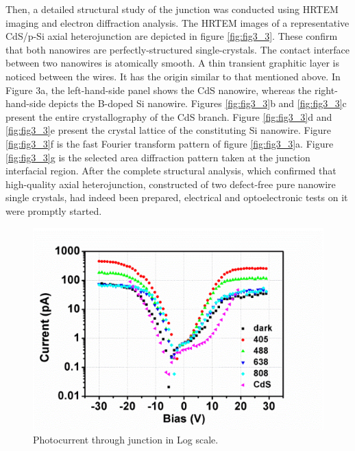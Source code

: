 Then, a detailed structural study of the junction was conducted using HRTEM imaging and electron diffraction analysis. The HRTEM images of a representative CdS/p-Si axial heterojunction are depicted in figure \ref{fig:fig3_3}. These confirm that both nanowires are perfectly-structured single-crystals. The contact interface between two nanowires is atomically smooth. A thin transient graphitic layer is noticed between the wires. It has the origin similar to that mentioned above. In Figure 3a, the left-hand-side panel shows the CdS nanowire, whereas the right-hand-side depicts the B-doped Si nanowire. Figures \ref{fig:fig3_3}b and \ref{fig:fig3_3}c present the entire crystallography of the CdS branch. Figure \ref{fig:fig3_3}d and \ref{fig:fig3_3}e present the crystal lattice of the constituting Si nanowire. Figure \ref{fig:fig3_3}f is the fast Fourier transform pattern of figure \ref{fig:fig3_3}a. Figure \ref{fig:fig3_3}g is the selected area diffraction pattern taken at the junction interfacial region. After the complete structural analysis, which confirmed that high-quality axial heterojunction, constructed of two defect-free pure nanowire single crystals, had indeed been prepared, electrical and optoelectronic tests on it were promptly started. 

\begin{figure}  
\includegraphics[width=\textwidth]{figures/figure3_4}
\caption[Photocurrent in Log scale.]{Photocurrent through junction in Log scale.
\label{fig:fig3_4}}
\end{figure}

